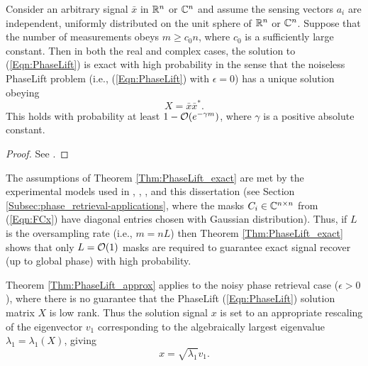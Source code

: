 \begin{theorem}  \label{Thm:PhaseLift_exact}
Consider an arbitrary signal $\bar{x}$ in ${\mathbb R}^n$ or ${\mathbb C}^n$ and assume the sensing vectors $a_i$ are independent, uniformly distributed on the unit sphere of ${\mathbb R}^n$ or ${\mathbb C}^n$.  Suppose that the number of measurements obeys $m \geq c_0 n$, where $c_0$ is a sufficiently large constant. Then in both the real and complex cases, the solution to (\ref{Eqn:PhaseLift}) is exact with high probability in the sense that the noiseless PhaseLift problem (i.e., (\ref{Eqn:PhaseLift}) with $\epsilon = 0$) has a unique solution obeying
\[
X = \bar{x}\bar{x}^*.
\]
This holds with probability at least $1 - {\mathcal O}(e^{-\gamma m})$, where $\gamma$ is a positive absolute constant.
\end{theorem}
\begin{proof}
See \cite[Section 2]{candes2014solving}.
\end{proof}




The assumptions of Theorem \ref{Thm:PhaseLift_exact} are met by the experimental models used in \cite{DBLP:journals/siamis/CandesESV13}, \cite{candes2013phaselift}, \cite{DBLP:journals/siamsc/FriedlanderM16}, and this dissertation (see Section \ref{Subsec:phase_retrieval-applications}, where the masks $C_i \in {\mathbb C}^{n \times n}$ from (\ref{Eqn:FCx}) have diagonal entries chosen with Gaussian distribution).  Thus, if $L$ is the oversampling rate (i.e., $m = nL$) then Theorem \ref{Thm:PhaseLift_exact} shows that only $L = {\mathcal O}(1)$ masks are required to guarantee exact signal recover (up to global phase) with high probability.




Theorem \ref{Thm:PhaseLift_approx} applies to the  noisy phase retrieval case ($\epsilon > 0$), where there is no guarantee that the PhaseLift (\ref{Eqn:PhaseLift}) solution matrix $X$ is low rank.  Thus the solution signal $x$ is set to an appropriate rescaling of the eigenvector $v_1$ corresponding to the algebraically largest eigenvalue $\lambda_1 = \lambda_1 (X)$, giving
\begin{equation}  			\label{Eqn:PhaseLift_solution_signal}
x = \sqrt{\lambda_1}v_1.
\end{equation}

